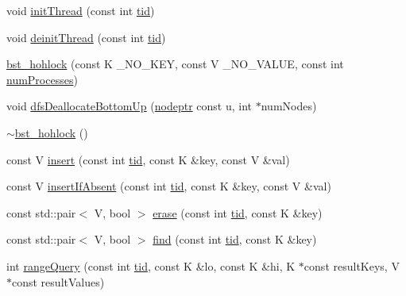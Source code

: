 \begin{DoxyCompactItemize}
\item 
void \hyperlink{classbst__hohlock__ns_1_1bst__hohlock_a2103fba4aa6854a65ec07dee69b04948}{init\+Thread} (const int \hyperlink{microbench_2main_8cpp_a9ca9869868fe7e7a38a921cc7de4103f}{tid})
\item 
void \hyperlink{classbst__hohlock__ns_1_1bst__hohlock_a4b7245eaaa163974dcee2e9a9342129d}{deinit\+Thread} (const int \hyperlink{microbench_2main_8cpp_a9ca9869868fe7e7a38a921cc7de4103f}{tid})
\item 
\hyperlink{classbst__hohlock__ns_1_1bst__hohlock_a33b94cc439dbbc725a7a659f48c5be91}{bst\+\_\+hohlock} (const K \+\_\+\+N\+O\+\_\+\+K\+EY, const V \+\_\+\+N\+O\+\_\+\+V\+A\+L\+UE, const int \hyperlink{testing_8cpp_aa085812188e21ede75351d88b9b2c30d}{num\+Processes})
\item 
void \hyperlink{classbst__hohlock__ns_1_1bst__hohlock_a98f8a385322a6d4640fa67ae0def3180}{dfs\+Deallocate\+Bottom\+Up} (\hyperlink{bst__rwlock__impl_8h_a04158d2a20768fe447133ff555823b05}{nodeptr} const u, int $\ast$num\+Nodes)
\item 
\hyperlink{classbst__hohlock__ns_1_1bst__hohlock_ac0f677db92933f5dffcb2e6726065e90}{$\sim$bst\+\_\+hohlock} ()
\item 
const V \hyperlink{classbst__hohlock__ns_1_1bst__hohlock_a9b46afa8c7037bee15ccd8f719f7da22}{insert} (const int \hyperlink{microbench_2main_8cpp_a9ca9869868fe7e7a38a921cc7de4103f}{tid}, const K \&key, const V \&val)
\item 
const V \hyperlink{classbst__hohlock__ns_1_1bst__hohlock_ac1edcbbd3a0568d015e9557b500b6595}{insert\+If\+Absent} (const int \hyperlink{microbench_2main_8cpp_a9ca9869868fe7e7a38a921cc7de4103f}{tid}, const K \&key, const V \&val)
\item 
const std\+::pair$<$ V, bool $>$ \hyperlink{classbst__hohlock__ns_1_1bst__hohlock_a16e17ba2d555f92e099637df6de96fdc}{erase} (const int \hyperlink{microbench_2main_8cpp_a9ca9869868fe7e7a38a921cc7de4103f}{tid}, const K \&key)
\item 
const std\+::pair$<$ V, bool $>$ \hyperlink{classbst__hohlock__ns_1_1bst__hohlock_aca8b371dd3fdd717419b00093a22490a}{find} (const int \hyperlink{microbench_2main_8cpp_a9ca9869868fe7e7a38a921cc7de4103f}{tid}, const K \&key)
\item 
int \hyperlink{classbst__hohlock__ns_1_1bst__hohlock_af75ce1966e19ad70a446847d29f40216}{range\+Query} (const int \hyperlink{microbench_2main_8cpp_a9ca9869868fe7e7a38a921cc7de4103f}{tid}, const K \&lo, const K \&hi, K $\ast$const result\+Keys, V $\ast$const result\+Values)

\end{DoxyCompactItemize}
